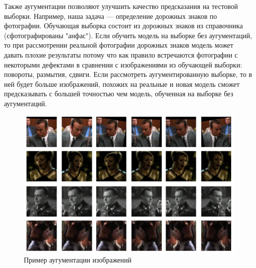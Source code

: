 \documentclass{article}
\theoremstyle{definition}
\theoremstyle{theorem}
\theoremstyle{remark}
\theoremstyle{theorem}
\theoremstyle{example}
\theoremstyle{theorem}
\theoremstyle{theorem}
\theoremstyle{theorem}
\theoremstyle{theorem}
\begin{document}
		Также аугументации позволяют улучшить качество предсказания на тестовой выборки. Например, наша задача --- определение дорожных знаков по фотографии. Обучающая выборка состоит из дорожных знаков из справочника (сфотографированы "анфас"). Если обучить модель на выборке без аугументаций, то при рассмотрении реальной фотографии дорожных знаков модель может давать плохие результаты потому что как правило встречаются фотографии с некоторыми дефектами в сравнении с изображениями из обучающей выборки: повороты, размытия, сдвиги. Если рассмотреть аугументированную выборке, то в ней будет больше изображений, похожих на реальные и новая модель сможет предсказывать с большей точностью чем модель, обученная на выборке без аугументаций.
		\newpage 
		\begin{figure}[h!]
			\includegraphics[width=\textwidth]{img/aug.png}\caption{Пример аугументации изображений}
		\end{figure}
\end{document}
